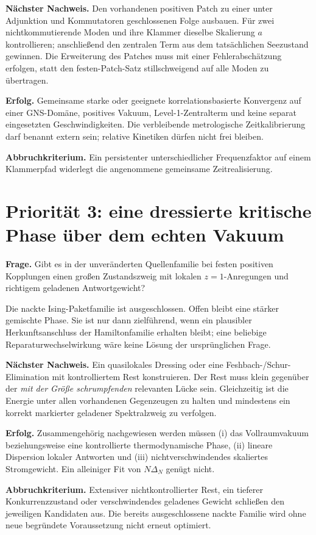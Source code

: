 \documentclass[11pt,a4paper,oneside,parskip=half,headings=normal,numbers=noenddot,bibliography=totoc]{scrreprt}
\begin{document}
\textbf{Nächster Nachweis.} Den vorhandenen positiven Patch zu einer unter Adjunktion und Kommutatoren geschlossenen Folge ausbauen. Für zwei nichtkommutierende Moden und ihre Klammer dieselbe Skalierung $a$ kontrollieren; anschließend den zentralen Term aus dem tatsächlichen Seezustand gewinnen. Die Erweiterung des Patches muss mit einer Fehlerabschätzung erfolgen, statt den festen-Patch-Satz stillschweigend auf alle Moden zu übertragen.

\textbf{Erfolg.} Gemeinsame starke oder geeignete korrelationsbasierte Konvergenz auf einer GNS-Domäne, positives Vakuum, Level-1-Zentralterm und keine separat eingesetzten Geschwindigkeiten. Die verbleibende metrologische Zeitkalibrierung darf benannt extern sein; relative Kinetiken dürfen nicht frei bleiben.

\textbf{Abbruchkriterium.} Ein persistenter unterschiedlicher Frequenzfaktor auf einem Klammerpfad widerlegt die angenommene gemeinsame Zeitrealisierung.

\section{Priorität 3: eine dressierte kritische Phase über dem echten Vakuum}
\textbf{Frage.} Gibt es in der unveränderten Quellenfamilie bei festen positiven Kopplungen einen großen Zustandszweig mit lokalen $z=1$-Anregungen und richtigem geladenen Antwortgewicht?

Die nackte Ising-Paketfamilie ist ausgeschlossen. Offen bleibt eine stärker gemischte Phase. Sie ist nur dann zielführend, wenn ein plausibler Herkunftsanschluss der Hamiltonfamilie erhalten bleibt; eine beliebige Reparaturwechselwirkung wäre keine Lösung der ursprünglichen Frage.

\textbf{Nächster Nachweis.} Ein quasilokales Dressing oder eine Feshbach-/Schur-Elimination mit kontrolliertem Rest konstruieren. Der Rest muss klein gegenüber der \emph{mit der Größe schrumpfenden} relevanten Lücke sein. Gleichzeitig ist die Energie unter allen vorhandenen Gegenzeugen zu halten und mindestens ein korrekt markierter geladener Spektralzweig zu verfolgen.

\textbf{Erfolg.} Zusammengehörig nachgewiesen werden müssen (i) das Vollraumvakuum beziehungsweise eine kontrollierte thermodynamische Phase, (ii) lineare Dispersion lokaler Antworten und (iii) nichtverschwindendes skaliertes Stromgewicht. Ein alleiniger Fit von $N\Delta_N$ genügt nicht.

\textbf{Abbruchkriterium.} Extensiver nichtkontrollierter Rest, ein tieferer Konkurrenzzustand oder verschwindendes geladenes Gewicht schließen den jeweiligen Kandidaten aus. Die bereits ausgeschlossene nackte Familie wird ohne neue begründete Voraussetzung nicht erneut optimiert.
\end{document}
